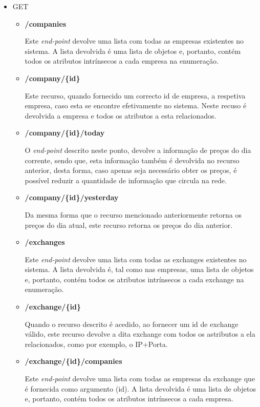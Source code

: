 \documentclass[a4paper,12pt]{article}
\begin{document}
\begin{itemize}
\item GET
  \begin{itemize}
    \item \textbf{/companies}
    \par Este \textit{end-point} devolve uma lista com todas as empresas existentes no sistema. A lista devolvida é uma lista de objetos e, portanto, contém todos os atributos intrínsecos a cada empresa na enumeração.
    
    \item \textbf{/company/\{id\}}
    \par Este recurso, quando fornecido um correcto id de empresa, a respetiva empresa, caso esta se encontre efetivamente no sistema. Neste recuso é devolvida a empresa e todos os atributos a esta relacionados.
    
    \item \textbf{/company/\{id\}/today}
    \par O \textit{end-point} descrito neste ponto, devolve a informação de preços do dia corrente, sendo que, esta informação também é devolvida no recurso anterior, desta forma, caso apenas seja necessário obter os preços, é possível reduzir a quantidade de informação que circula na rede.
    
    \item \textbf{/company/\{id\}/yesterday}
    \par Da mesma forma que o recurso mencionado anteriormente retorna os preços do dia atual, este recurso retorna os preços do dia anterior.
    
    \item \textbf{/exchanges}
    \par Este \textit{end-point} devolve uma lista com todas as exchanges existentes no sistema. A lista devolvida é, tal como nas empresas, uma lista de objetos e, portanto, contém todos os atributos intrínsecos a cada exchange na enumeração.

    \item \textbf{/exchange/\{id\}}
    \par Quando o recurso descrito é acedido, ao fornecer um id de exchange válido, este recurso devolve a dita exchange com todos os astributos a ela relacionados, como por exemplo, o IP+Porta.

    \item \textbf{/exchange/\{id\}/companies}
    \par Este \textit{end-point} devolve uma lista com todas as empresas da exchange que é fornecida como argumento (id). A lista devolvida é uma lista de objetos e, portanto, contém todos os atributos intrínsecos a cada empresa.
    

\end{itemize}
\end{itemize}
\end{document}
